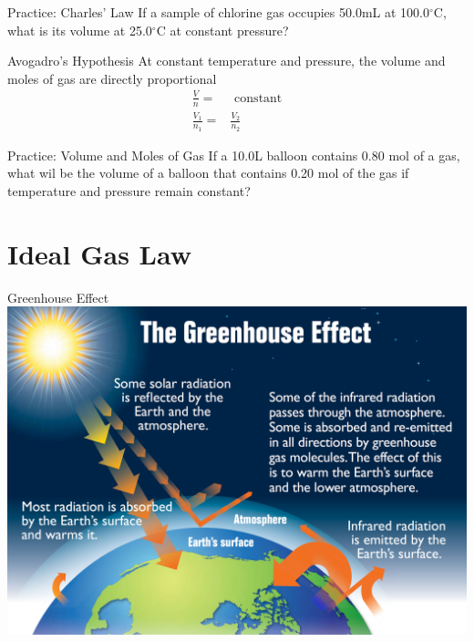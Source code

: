 \documentclass[11pt]{beamer}
\begin{document}
\begin{frame}{Practice: Charles' Law}
  If a sample of chlorine gas occupies 50.0mL at 100.0$^\circ$C,
  what is its volume at 25.0$^\circ$C at constant pressure?
  
  \vspace{1.5in}
\end{frame}

\begin{frame}{Avogadro's Hypothesis}
  At constant temperature and pressure, the volume and moles of gas
  are directly proportional
  \begin{align}
    \frac{V}{n} = & \text{ constant} \\
    \frac{V_1}{n_1} = & \frac{V_2}{n_2}
  \end{align}
\end{frame}

\begin{frame}{Practice: Volume and Moles of Gas}
  If a 10.0L balloon contains 0.80 mol of a gas, what wil be the volume
  of a balloon that contains 0.20 mol of the gas if temperature and
  pressure remain constant?

  \vspace{1.5in}
\end{frame}

\section{Ideal Gas Law}

\begin{frame}{Greenhouse Effect}
  \centering
  \includegraphics[width=\linewidth]{greenhouse_effect}
\end{frame}
\end{document}
